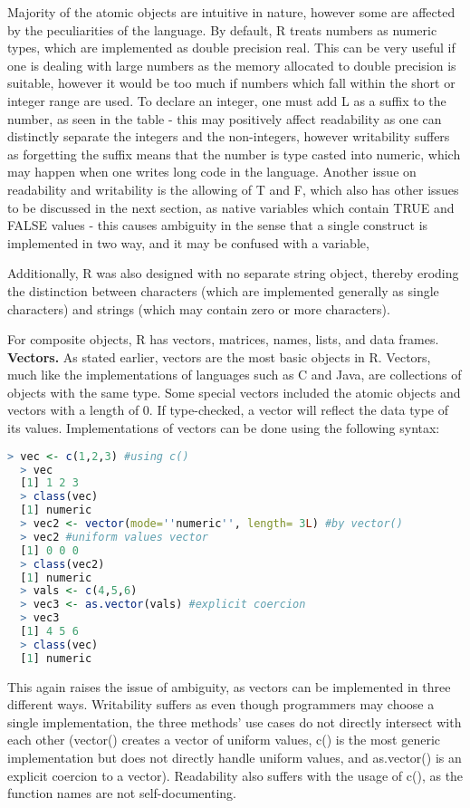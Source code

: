 \documentclass[12pt]{article}
\begin{document}
Majority of the atomic objects are intuitive in nature, however some are affected by the peculiarities of the language. By default, R treats numbers as numeric types, which are implemented as double precision real. This can be very useful if one is dealing with large numbers as the memory allocated to double precision is suitable, however it would be too much if numbers which fall within the short or integer range are used. To declare an integer, one must add L as a suffix to the number, as seen in the table - this may positively affect readability as one can distinctly separate the integers and the non-integers, however writability suffers as forgetting the suffix means that the number is type casted into numeric, which may happen when one writes long code in the language. Another issue on readability and writability is the allowing of T and F, which also has other issues to be discussed in the next section, as native variables which contain TRUE and FALSE values - this causes ambiguity in the sense that a single construct is implemented in two way, and it may be confused with a variable,


Additionally, R was also designed with no separate string object, thereby eroding the distinction between characters (which are implemented generally as single characters) and strings (which may contain zero or more characters).

For composite objects, R has vectors, matrices, names, lists, and data frames. \\

\textbf{Vectors.} As stated earlier, vectors are the most basic objects in R. Vectors, much like the implementations of languages such as C and Java, are collections of objects with the same type. Some special vectors included the atomic objects and vectors with a length of 0. If type-checked, a vector will reflect the data type of its values. Implementations of vectors can be done using the following syntax:

\begin{lstlisting}[language=R, frame=none]
  > vec <- c(1,2,3) #using c()
  > vec
  [1] 1 2 3
  > class(vec)
  [1] numeric
  > vec2 <- vector(mode=''numeric'', length= 3L) #by vector()
  > vec2 #uniform values vector
  [1] 0 0 0
  > class(vec2)
  [1] numeric
  > vals <- c(4,5,6)
  > vec3 <- as.vector(vals) #explicit coercion
  > vec3
  [1] 4 5 6
  > class(vec)
  [1] numeric
\end{lstlisting}

This again raises the issue of ambiguity, as vectors can be implemented in three different ways. Writability suffers as even though programmers may choose a single implementation, the three methods' use cases do not directly intersect with each other (vector() creates a vector of uniform values, c() is the most generic implementation but does not directly handle uniform values, and as.vector() is an explicit coercion to a vector). Readability also suffers with the usage of c(), as the function names are not self-documenting.\\
\end{document}
